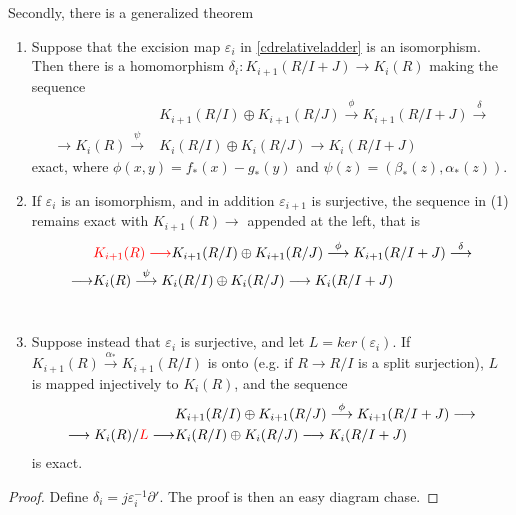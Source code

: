 	Secondly, there is a generalized theorem
	\begin{theorem}
	\begin{enumerate}
		\item  Suppose that the excision map $\varepsilon_i$ in \ref{cdrelativeladder} is an isomorphism. Then there is a homomorphism $\delta_i \colon K_{i+1}(R/I+J)\longrightarrow K_i(R)$ making the sequence 
		\begin{align*}
		&K_{i+1}(R/I)\oplus K_{i+1}(R/J)\overset{\phi}\longrightarrow K_{i+1}(R/I+J)\overset{\delta} \longrightarrow \\
	\longrightarrow K_i(R) \overset{\psi}\longrightarrow & K_i(R/I)\oplus K_i(R/J)\longrightarrow K_i(R/I+J)
		\end{align*}	
exact, where $\phi(x,y)=f_*(x)-g_*(y)$ and $\psi(z)=(\beta_*(z),\alpha_*(z))$. \\
	\item If $\varepsilon_i$ is an isomorphism, and in addition $\varepsilon_{i+1}$ is surjective, the sequence in (1) remains exact with $K_{i+1}(R)\longrightarrow$  appended at the left, that is
	\begin{align*}
		&{\color{red} K_{i+1}(R) \longrightarrow} K_{i+1}(R/I)\oplus K_{i+1}(R/J)\overset{\phi}\longrightarrow K_{i+1}(R/I+J)\overset{\delta} \longrightarrow \\
	\longrightarrow &K_i(R) \overset{\psi}\longrightarrow K_i(R/I)\oplus K_i(R/J)\longrightarrow K_i(R/I+J)
		\end{align*} \\
	\item Suppose instead  that $\varepsilon_i$  is  surjective,  and  let  $L =  ker(\varepsilon_i)$. If
$K_{i+1}(R) \overset{\alpha_*}\longrightarrow K_{i+1}(R/I) $ is onto (e.g.  if $ R \longrightarrow  R/I$ is a split surjection), $L$ is mapped
injectively to $K_i(R)$, and the sequence
\begin{align*}
		&K_{i+1}(R/I)\oplus K_{i+1}(R/J)\overset{\phi}\longrightarrow K_{i+1}(R/I+J) \longrightarrow \\
	\longrightarrow K_i(R)/{\color{red}L} \longrightarrow & K_i(R/I)\oplus K_i(R/J)\longrightarrow K_i(R/I+J)
		\end{align*}
is exact.
	\end{enumerate}
	\end{theorem}
\begin{proof}
	Define  $\delta_i=j \varepsilon_i^{-1}\partial'$. The proof is then an easy diagram chase.
\end{proof}

